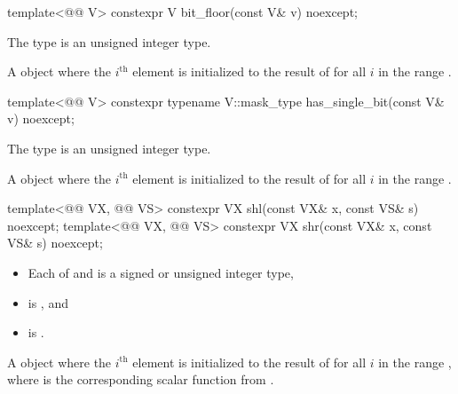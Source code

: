 \begin{itemdecl}
template<@@ V> constexpr V bit_floor(const V& v) noexcept;
\end{itemdecl}

\begin{itemdescr}
\pnum
\constraints
The type  is an unsigned integer type.

\pnum
\returns
A  object where the $i^\text{th}$ element is initialized to
the result of  for all $i$ in the range
.
\end{itemdescr}

\begin{itemdecl}
template<@@ V>
  constexpr typename V::mask_type has_single_bit(const V& v) noexcept;
\end{itemdecl}

\begin{itemdescr}
\pnum
\constraints
The type  is an unsigned integer type.

\pnum
\returns
A  object where the $i^\text{th}$ element is initialized
to the result of  for all $i$ in the range
.
\end{itemdescr}

\begin{itemdecl}
template<@@ VX, @@ VS>
  constexpr VX shl(const VX& x, const VS& s) noexcept;
template<@@ VX, @@ VS>
  constexpr VX shr(const VX& x, const VS& s) noexcept;
\end{itemdecl}

\begin{itemdescr}
\pnum
\constraints
\begin{itemize}
\item
Each of  and 
is a signed or unsigned integer type,
\item
{} is , and
\item
{}
is .
\end{itemize}

\pnum
\returns
A  object where the $i^\text{th}$ element is initialized to
the result of 
for all $i$ in the range ,
where  is the corresponding scalar function from .
\end{itemdescr}


